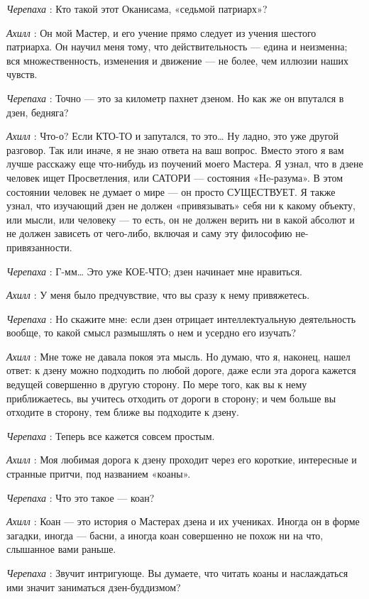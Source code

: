 \emph{Черепаха} : Кто такой этот Оканисама, «седьмой патриарх»?

\emph{Ахилл} : Он мой Мастер, и его учение прямо следует из учения шестого патриарха. Он научил меня тому, что действительность --- едина и неизменна; вся множественность, изменения и движение --- не более, чем иллюзии наших чувств.

\emph{Черепаха} : Точно --- это за километр пахнет дзеном. Но как же он впутался в дзен, бедняга?

\emph{Ахилл} : Что-о? Если КТО-ТО и запутался, то это\ldots{} Ну ладно, это уже другой разговор. Так или иначе, я не знаю ответа на ваш вопрос. Вместо этого я вам лучше расскажу еще что-нибудь из поучений моего Мастера. Я узнал, что в дзене человек ищет Просветления, или САТОРИ --- состояния «He-разума». В этом состоянии человек не думает о мире --- он просто СУЩЕСТВУЕТ. Я также узнал, что изучающий дзен не должен «привязывать» себя ни к какому объекту, или мысли, или человеку --- то есть, он не должен верить ни в какой абсолют и не должен зависеть от чего-либо, включая и саму эту философию не-привязанности.

\emph{Черепаха} : Г-мм\ldots{} Это уже КОЕ-ЧТО; дзен начинает мне нравиться.

\emph{Ахилл} : У меня было предчувствие, что вы сразу к нему привяжетесь.

\emph{Черепаха} : Но скажите мне: если дзен отрицает интеллектуальную деятельность вообще, то какой смысл размышлять о нем и усердно его изучать?

\emph{Ахилл} : Мне тоже не давала покоя эта мысль. Но думаю, что я, наконец, нашел ответ: к дзену можно подходить по любой дороге, даже если эта дорога кажется ведущей совершенно в другую сторону. По мере того, как вы к нему приближаетесь, вы учитесь отходить от дороги в сторону; и чем больше вы отходите в сторону, тем ближе вы подходите к дзену.

\emph{Черепаха} : Теперь все кажется совсем простым.

\emph{Ахилл} : Моя любимая дорога к дзену проходит через его короткие, интересные и странные притчи, под названием «коаны».

\emph{Черепаха} : Что это такое --- коан?

\emph{Ахилл} : Коан --- это история о Мастерах дзена и их учениках. Иногда он в форме загадки, иногда --- басни, а иногда коан совершенно не похож ни на что, слышанное вами раньше.

\emph{Черепаха} : Звучит интригующе. Вы думаете, что читать коаны и наслаждаться ими значит заниматься дзен-буддизмом?

